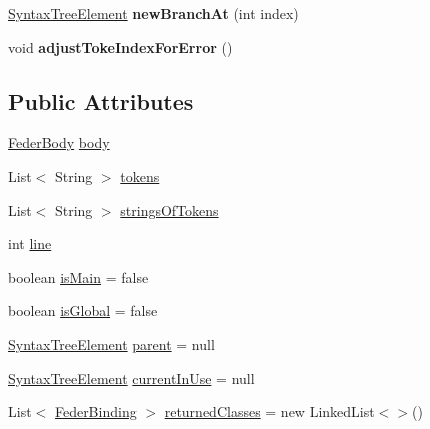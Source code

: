 \begin{DoxyCompactItemize}
\item 
\mbox{\label{classfeder_1_1SyntaxTreeElement_af39968e65d469770c8e32504b2cbe456}} 
\hyperlink{classfeder_1_1SyntaxTreeElement}{Syntax\+Tree\+Element} {\bfseries new\+Branch\+At} (int index)
\item 
\mbox{\label{classfeder_1_1SyntaxTreeElement_a869f9c4a0922f75fbb67b0e32d72993c}} 
void {\bfseries adjust\+Toke\+Index\+For\+Error} ()
\end{DoxyCompactItemize}
\subsection*{Public Attributes}
\begin{DoxyCompactItemize}
\item 
\hyperlink{classfeder_1_1types_1_1FederBody}{Feder\+Body} \hyperlink{classfeder_1_1SyntaxTreeElement_ab51b13755de9c3b80a8efc80623a0984}{body}
\item 
List$<$ String $>$ \hyperlink{classfeder_1_1SyntaxTreeElement_a182c15de3f81dc29277f2f0ed0cdbc75}{tokens}
\item 
List$<$ String $>$ \hyperlink{classfeder_1_1SyntaxTreeElement_af2b1da7d86435877aeaaa596757c9024}{strings\+Of\+Tokens}
\item 
int \hyperlink{classfeder_1_1SyntaxTreeElement_a981531bca4fc8278733070a75f527c2f}{line}
\item 
boolean \hyperlink{classfeder_1_1SyntaxTreeElement_a7663d58a44d59cc8387a2450f3711861}{is\+Main} = false
\item 
boolean \hyperlink{classfeder_1_1SyntaxTreeElement_acbef29db75b411ac807d29f771f713bd}{is\+Global} = false
\item 
\hyperlink{classfeder_1_1SyntaxTreeElement}{Syntax\+Tree\+Element} \hyperlink{classfeder_1_1SyntaxTreeElement_a2579fc657b1d11be61366cb13f0469f0}{parent} = null
\item 
\hyperlink{classfeder_1_1SyntaxTreeElement}{Syntax\+Tree\+Element} \hyperlink{classfeder_1_1SyntaxTreeElement_a4d6ca5319ab4dc3d6d79acd164fb9b23}{current\+In\+Use} = null
\item 
List$<$ \hyperlink{classfeder_1_1types_1_1FederBinding}{Feder\+Binding} $>$ \hyperlink{classfeder_1_1SyntaxTreeElement_ac46377f158537e18b24d6cbe149b22e2}{returned\+Classes} = new Linked\+List$<$$>$()
\item 
\mbox{\label{classfeder_1_1SyntaxTreeElement_a11aeec41d48a2f634ffb6d40c3efdfba}} 
$$
\end{DoxyCompactItemize}
